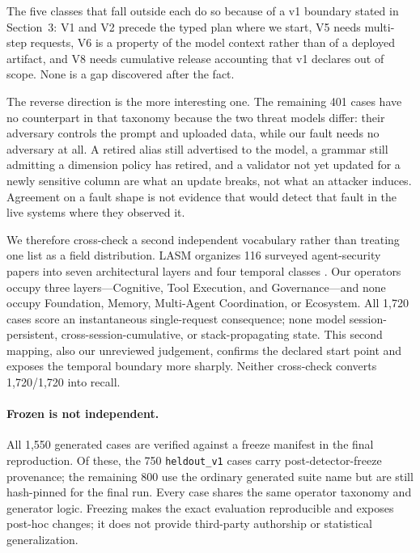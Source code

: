 The five classes that fall outside each do so because of a v1 boundary stated in Section~3: V1 and V2 precede the typed plan where we start, V5 needs multi-step requests, V6 is a property of the model context rather than of a deployed artifact, and V8 needs cumulative release accounting that v1 declares out of scope. None is a gap discovered after the fact.

The reverse direction is the more interesting one. The remaining 401 cases have no counterpart in that taxonomy because the two threat models differ: their adversary controls the prompt and uploaded data, while our fault needs no adversary at all. A retired alias still advertised to the model, a grammar still admitting a dimension policy has retired, and a validator not yet updated for a newly sensitive column are what an update breaks, not what an attacker induces. Agreement on a fault shape is not evidence that \policystrata{} would detect that fault in the live systems where they observed it.

We therefore cross-check a second independent vocabulary rather than treating one list as a field distribution. LASM organizes 116 surveyed agent-security papers into seven architectural layers and four temporal classes \citep{lasm}. Our operators occupy three layers---Cognitive, Tool Execution, and Governance---and none occupy Foundation, Memory, Multi-Agent Coordination, or Ecosystem. All 1,720 cases score an instantaneous single-request consequence; none model session-persistent, cross-session-cumulative, or stack-propagating state. This second mapping, also our unreviewed judgement, confirms the declared start point and exposes the temporal boundary more sharply. Neither cross-check converts 1,720/1,720 into recall.

\paragraph{Frozen is not independent.}
All 1,550 generated cases are verified against a freeze manifest in the final reproduction. Of these, the 750 \texttt{heldout\_v1} cases carry post-detector-freeze provenance; the remaining 800 use the ordinary generated suite name but are still hash-pinned for the final run. Every case shares the same operator taxonomy and generator logic. Freezing makes the exact evaluation reproducible and exposes post-hoc changes; it does not provide third-party authorship or statistical generalization.
